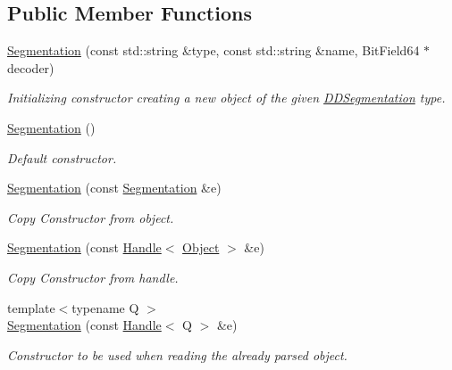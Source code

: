 \subsection*{Public Member Functions}
\begin{DoxyCompactItemize}
\item 
\hyperlink{class_d_d4hep_1_1_geometry_1_1_segmentation_aefd1b9d678af0f0863c7d83d8f0e2534}{Segmentation} (const std::string \&type, const std::string \&name, BitField64 $\ast$decoder)
\begin{DoxyCompactList}\small\item\em Initializing constructor creating a new object of the given \hyperlink{namespace_d_d4hep_1_1_d_d_segmentation}{DDSegmentation} type. \item\end{DoxyCompactList}\item 
\hyperlink{class_d_d4hep_1_1_geometry_1_1_segmentation_aedf30e71b234a1d29a3084b1a4910165}{Segmentation} ()
\begin{DoxyCompactList}\small\item\em Default constructor. \item\end{DoxyCompactList}\item 
\hyperlink{class_d_d4hep_1_1_geometry_1_1_segmentation_a0d8474b604d7eb4ca635007f9e46cbc2}{Segmentation} (const \hyperlink{class_d_d4hep_1_1_geometry_1_1_segmentation}{Segmentation} \&e)
\begin{DoxyCompactList}\small\item\em Copy Constructor from object. \item\end{DoxyCompactList}\item 
\hyperlink{class_d_d4hep_1_1_geometry_1_1_segmentation_a52de777daf55b13d94eae2eb8f794b89}{Segmentation} (const \hyperlink{class_d_d4hep_1_1_handle}{Handle}$<$ \hyperlink{class_d_d4hep_1_1_geometry_1_1_segmentation_object}{Object} $>$ \&e)
\begin{DoxyCompactList}\small\item\em Copy Constructor from handle. \item\end{DoxyCompactList}\item 
{\footnotesize template$<$typename Q $>$ }\\\hyperlink{class_d_d4hep_1_1_geometry_1_1_segmentation_ae96b3a9b6f30bb6694d0b0d6751adbca}{Segmentation} (const \hyperlink{class_d_d4hep_1_1_handle}{Handle}$<$ Q $>$ \&e)
\begin{DoxyCompactList}\small\item\em Constructor to be used when reading the already parsed object. \item\end{DoxyCompactList}\item 

\end{DoxyCompactItemize}

